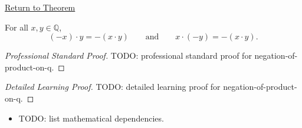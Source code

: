 \newpage
{}
\label{prf:negation-of-product-on-q}

\begin{remark*}[Return]
\hyperref[cor:negation-of-product-on-q]{Return to Theorem}
\end{remark*}

\begin{corollary*}
For all $x,y\in\mathbb{Q}$,
\[
(-x)\cdot y=-(x\cdot y)
\qquad\text{and}\qquad
x\cdot(-y)=-(x\cdot y).
\]
\end{corollary*}

\begin{proof}[Professional Standard Proof]
\LRAProofBodyStart
TODO: professional standard proof for negation-of-product-on-q.
\end{proof}

\begin{proof}[Detailed Learning Proof]
\LRAProofBodyStart
TODO: detailed learning proof for negation-of-product-on-q.
\end{proof}

\begin{remark*}
\end{remark*}

\begin{dependencies}
\begin{itemize}
  \item TODO: list mathematical dependencies.
\end{itemize}
\end{dependencies}

\clearpage
